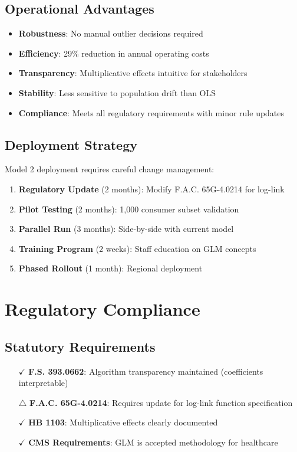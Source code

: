 \subsection{Operational Advantages}

\begin{itemize}
    \item \textbf{Robustness}: No manual outlier decisions required
    \item \textbf{Efficiency}: 29\% reduction in annual operating costs
    \item \textbf{Transparency}: Multiplicative effects intuitive for stakeholders
    \item \textbf{Stability}: Less sensitive to population drift than OLS
    \item \textbf{Compliance}: Meets all regulatory requirements with minor rule updates
\end{itemize}

\subsection{Deployment Strategy}

Model 2 deployment requires careful change management:

\begin{enumerate}
    \item \textbf{Regulatory Update} (2 months): Modify F.A.C. 65G-4.0214 for log-link
    \item \textbf{Pilot Testing} (2 months): 1,000 consumer subset validation
    \item \textbf{Parallel Run} (3 months): Side-by-side with current model
    \item \textbf{Training Program} (2 weeks): Staff education on GLM concepts
    \item \textbf{Phased Rollout} (1 month): Regional deployment
\end{enumerate}

\section{Regulatory Compliance}

\subsection{Statutory Requirements}

\begin{itemize}
    \item[$\checkmark$] \textbf{F.S. 393.0662}: Algorithm transparency maintained (coefficients interpretable)
    \item[$\triangle$] \textbf{F.A.C. 65G-4.0214}: Requires update for log-link function specification
    \item[$\checkmark$] \textbf{HB 1103}: Multiplicative effects clearly documented
    \item[$\checkmark$] \textbf{CMS Requirements}: GLM is accepted methodology for healthcare
\end{itemize}

